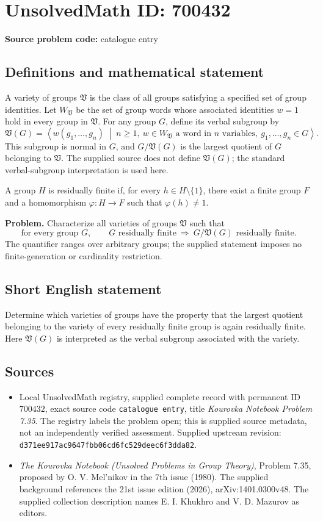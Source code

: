 \documentclass[11pt]{article}
\begin{document}
\section*{UnsolvedMath ID: 700432}
\textbf{Source problem code:} catalogue entry
\subsection{Definitions and mathematical statement}
A variety of groups \(\mathfrak V\) is the class of all groups satisfying a specified set of group identities. Let \(W_{\mathfrak V}\) be the set of group words whose associated identities \(w=1\) hold in every group in \(\mathfrak V\). For any group \(G\), define its verbal subgroup by
\[
\mathfrak V(G)=\left\langle w(g_1,\ldots,g_n)\;\middle|\; n\geq 1,\ w\in W_{\mathfrak V}\text{ a word in }n\text{ variables},\ g_1,\ldots,g_n\in G\right\rangle.
\]
This subgroup is normal in \(G\), and \(G/\mathfrak V(G)\) is the largest quotient of \(G\) belonging to \(\mathfrak V\). The supplied source does not define \(\mathfrak V(G)\); the standard verbal-subgroup interpretation is used here.

A group \(H\) is residually finite if, for every \(h\in H\setminus\{1\}\), there exist a finite group \(F\) and a homomorphism \(\varphi:H\to F\) such that \(\varphi(h)\neq 1\).

\textbf{Problem.} Characterize all varieties of groups \(\mathfrak V\) such that
\[
\text{for every group }G,\qquad G\text{ residually finite}\ \Longrightarrow\ G/\mathfrak V(G)\text{ residually finite}.
\]
The quantifier ranges over arbitrary groups; the supplied statement imposes no finite-generation or cardinality restriction.
\subsection{Short English statement}
Determine which varieties of groups have the property that the largest quotient belonging to the variety of every residually finite group is again residually finite. Here \(\mathfrak V(G)\) is interpreted as the verbal subgroup associated with the variety.
\subsection{Sources}
\begin{itemize}
\item Local UnsolvedMath registry, supplied complete record with permanent ID \(700432\), exact source code \texttt{catalogue entry}, title \emph{Kourovka Notebook Problem 7.35}. The registry labels the problem open; this is supplied source metadata, not an independently verified assessment. Supplied upstream revision: \texttt{d371ee917ac9647fbb06cd6fc529deec6f3dda82}.
\item \emph{The Kourovka Notebook (Unsolved Problems in Group Theory)}, Problem 7.35, proposed by O. V. Mel'nikov in the 7th issue (1980). The supplied background references the 21st issue edition (2026), arXiv:1401.0300v48. The supplied collection description names E. I. Khukhro and V. D. Mazurov as editors.
\end{itemize}
\end{document}
